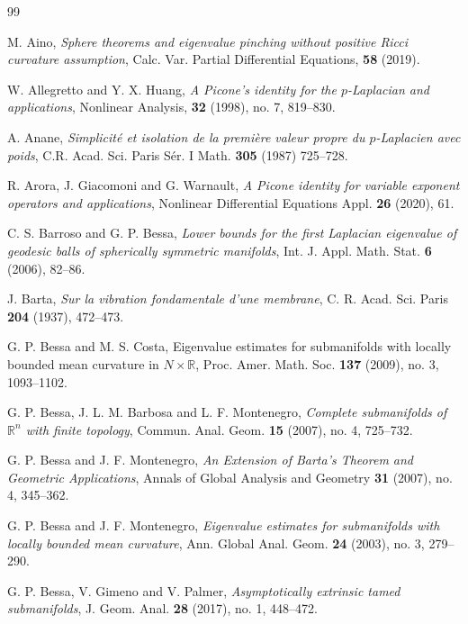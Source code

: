 \documentclass{article}
\begin{document}
\begin{thebibliography}{99}

 M. Aino, {\em Sphere theorems and eigenvalue pinching without positive Ricci curvature assumption}, Calc. Var. Partial Differential Equations, \textbf{58}  (2019).

W. Allegretto and Y. X. Huang, {\em A Picone's identity for the $p$-Laplacian and applications}, Nonlinear Analysis, \textbf{32} (1998), no. 7, 819--830.


 A. Anane, {\em Simplicité et isolation de la première valeur propre du $p$-Laplacien avec poids}, C.R. Acad. Sci.
Paris Sér. I Math. \textbf{305} (1987) 725--728.

R. Arora, J. Giacomoni and G. Warnault, \emph{A Picone identity for variable exponent operators and applications}, Nonlinear Differential Equations Appl. \textbf{26} (2020), 61.

 C. S. Barroso and G. P. Bessa,
\emph{Lower bounds for the first Laplacian eigenvalue of geodesic balls of spherically symmetric manifolds}, Int. J. Appl. Math. Stat. \textbf{6} (2006), 82--86. 

 J. Barta,  \emph{Sur la vibration fondamentale d'une membrane},
C. R. Acad. Sci. Paris \textbf{204} (1937), 472--473.

 G. P. Bessa and M. S. Costa,
Eigenvalue estimates for submanifolds with locally bounded mean curvature in $N \times \mathbb{R}$, Proc. Amer. Math. Soc. \textbf{137} (2009), no. 3, 1093--1102.


G. P. Bessa, J. L. M. Barbosa and L. F. Montenegro,
\emph{Complete submanifolds of $\mathbb{R}^n$ with finite topology},
Commun. Anal. Geom. {\bf 15} (2007), no. 4, 725--732.

 G. P. Bessa and J. F. Montenegro, \emph{An Extension of Barta's Theorem and Geometric Applications}, Annals of Global Analysis and Geometry \textbf{31} (2007), no. 4, 345--362.

 G. P. Bessa and J. F. Montenegro, \emph{Eigenvalue estimates for submanifolds with locally bounded mean curvature}, Ann. Global Anal. Geom. \textbf{24} (2003), no. 3, 279--290.

G. P. Bessa, V. Gimeno and V. Palmer,
\emph{Asymptotically extrinsic tamed submanifolds}, J. Geom. Anal. {\bf 28} (2017), no. 1, 448--472.


\end{thebibliography}
\end{document}
